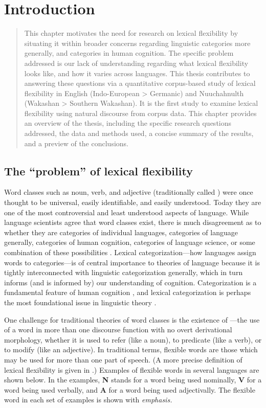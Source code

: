 \chapter{Introduction}
\label{ch:introduction}

\blockquote{This chapter motivates the need for research on lexical flexibility by situating it within broader concerns regarding linguistic categories more generally, and categories in human cognition. The specific problem addressed is our lack of understanding regarding what lexical flexibility looks like, and how it varies across languages. This thesis contributes to answering these questions via a quantitative corpus-based study of lexical flexibility in English (Indo-European > Germanic) and Nuuchahnulth (Wakashan > Southern Wakashan). It is the first study to examine lexical flexibility using natural discourse from corpus data. This chapter provides an overview of the thesis, including the specific research questions addressed, the data and methods used, a concise summary of the results, and a preview of the conclusions.}

\section{The \enquote{problem} of lexical flexibility}
\label{sec:1.1}

Word classes such as noun, verb, and adjective (traditionally called ) were once thought to be universal, easily identifiable, and easily understood. Today they are one of the most controversial and least understood aspects of language. While language scientists agree that word classes exist, there is much disagreement as to whether they are categories of individual languages, categories of language generally, categories of human cognition, categories of language science, or some combination of these possibilities \parencites[166]{Mithun2017}{Haspelmath2018}{Hieberforthcoming}. Lexical categorization—how languages assign words to categories—is of central importance to theories of language because it is tightly interconnected with linguistic categorization generally, which in turn informs (and is informed by) our understanding of cognition. Categorization is a fundamental feature of human cognition \parencite[xi]{Taylor2003}, and lexical categorization is perhaps the most foundational issue in linguistic theory \parencites[36]{Croft1991}[1]{VapnarskyVeneziano2017}.

One challenge for traditional theories of word classes is the existence of —the use of a word in more than one discourse function with no overt derivational morphology, whether it is used to refer (like a noun), to predicate (like a verb), or to modify (like an adjective). In traditional terms, flexible words are those which may be used for more than one part of speech. (A more precise definition of lexical flexibility is given in .) Examples of flexible words in several languages are shown below. In the examples, \textbf{N} stands for a word being used nominally, \textbf{V} for a word being used verbally, and \textbf{A} for a word being used adjectivally. The flexible word in each set of examples is shown with \em{emphasis}.

